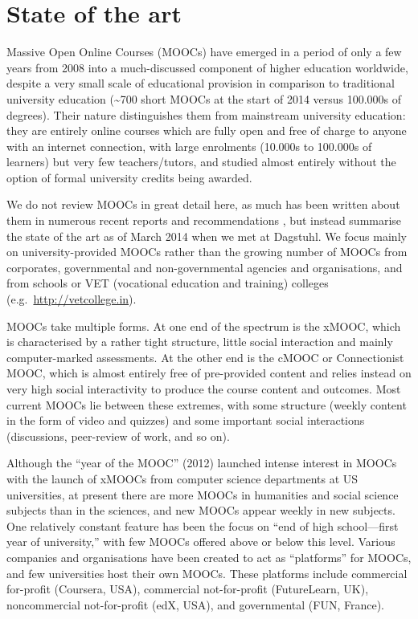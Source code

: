 \section{State of the art}

Massive Open Online Courses (MOOCs) have emerged in a period of only a
few years from 2008 into a much-discussed component of higher education
worldwide, despite a very small scale of educational provision in
comparison to traditional university education (\textasciitilde{}700
short MOOCs at the 
start of 2014 versus 100.000s of degrees).  Their nature distinguishes
them from mainstream university education: they are entirely online
courses which are fully open and free of charge to anyone with an
internet connection, with large enrolments (10.000s to 100.000s of
learners) but very few teachers/tutors, and studied almost entirely
without the option of formal university credits being awarded.

We do not review MOOCs in great detail here, as much has been written
about them in numerous recent reports and recommendations 
\cite{gaebel-moocs-2013,uk.gov.mooc-2013,UUK-mooc-2013,
 past-2013,InvasionoftheMOOCs-2014,mroe-2013-report,
 moocs-expectations-and-reality},
but instead summarise the state of
the art as of March 2014 when we met at Dagstuhl.
We focus mainly on university-provided MOOCs rather than
the growing number of MOOCs from corporates, governmental and
non-governmental agencies and organisations, and from schools or VET
(vocational education and training)
colleges (e.g.\ \url{http://vetcollege.in}).

MOOCs take multiple forms.  At one end of the spectrum is the xMOOC,
which is characterised by a rather tight structure, little social
interaction and mainly computer-marked assessments.  
At the other end
is the cMOOC or Connectionist MOOC, which is almost entirely free of
pre-provided content and relies instead on very high social
interactivity to produce the 
course content and outcomes.  Most current MOOCs lie
between these extremes, with some structure (weekly content in the form
of video and quizzes) and some important social interactions
(discussions, peer-review of work, and so on).

Although the ``year of the MOOC'' (2012) launched intense interest in
MOOCs with the launch of xMOOCs from computer science
departments at US universities, at present there are more MOOCs in
humanities and social 
science subjects than in the sciences, and new MOOCs appear weekly in new
subjects.  One relatively constant feature has been the focus on ``end of
high school---first year of university,'' with few MOOCs offered above or
below this level.  Various companies and organisations have been created
to act as   ``platforms'' for MOOCs, and few universities host their own
MOOCs. These platforms include commercial for-profit (Coursera, USA),
commercial not-for-profit (FutureLearn, UK), noncommercial
not-for-profit (edX, USA), and governmental (FUN, France).

